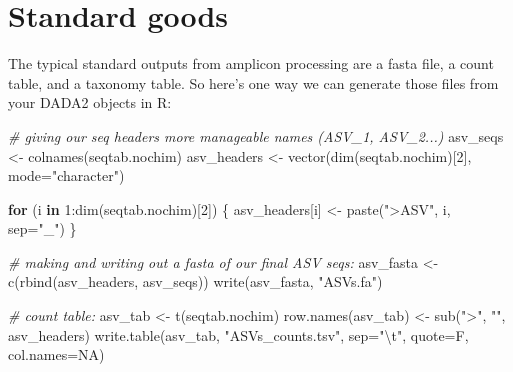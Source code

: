 \documentclass[
]{book}
\newenvironment{Shaded}{\begin{snugshade}}{\end{snugshade}}
\newcommand{\AttributeTok}[1]{\textcolor[rgb]{0.77,0.63,0.00}{#1}}
\newcommand{\CommentTok}[1]{\textcolor[rgb]{0.56,0.35,0.01}{\textit{#1}}}
\newcommand{\ConstantTok}[1]{\textcolor[rgb]{0.00,0.00,0.00}{#1}}
\newcommand{\ControlFlowTok}[1]{\textcolor[rgb]{0.13,0.29,0.53}{\textbf{#1}}}
\newcommand{\DecValTok}[1]{\textcolor[rgb]{0.00,0.00,0.81}{#1}}
\newcommand{\FunctionTok}[1]{\textcolor[rgb]{0.00,0.00,0.00}{#1}}
\newcommand{\NormalTok}[1]{#1}
\newcommand{\OtherTok}[1]{\textcolor[rgb]{0.56,0.35,0.01}{#1}}
\newcommand{\SpecialCharTok}[1]{\textcolor[rgb]{0.00,0.00,0.00}{#1}}
\newcommand{\StringTok}[1]{\textcolor[rgb]{0.31,0.60,0.02}{#1}}
\begin{document}
\hypertarget{standard-goods}{%
\section{Standard goods}\label{standard-goods}}

The typical standard outputs from amplicon processing are a fasta file, a count table, and a taxonomy table. So here's one way we can generate those files from your DADA2 objects in R:

\begin{Shaded}
\begin{Highlighting}[]
  \CommentTok{\# giving our seq headers more manageable names (ASV\_1, ASV\_2...)}
\NormalTok{asv\_seqs }\OtherTok{\textless{}{-}} \FunctionTok{colnames}\NormalTok{(seqtab.nochim)}
\NormalTok{asv\_headers }\OtherTok{\textless{}{-}} \FunctionTok{vector}\NormalTok{(}\FunctionTok{dim}\NormalTok{(seqtab.nochim)[}\DecValTok{2}\NormalTok{], }\AttributeTok{mode=}\StringTok{"character"}\NormalTok{)}

\ControlFlowTok{for}\NormalTok{ (i }\ControlFlowTok{in} \DecValTok{1}\SpecialCharTok{:}\FunctionTok{dim}\NormalTok{(seqtab.nochim)[}\DecValTok{2}\NormalTok{]) \{}
\NormalTok{  asv\_headers[i] }\OtherTok{\textless{}{-}} \FunctionTok{paste}\NormalTok{(}\StringTok{"\textgreater{}ASV"}\NormalTok{, i, }\AttributeTok{sep=}\StringTok{"\_"}\NormalTok{)}
\NormalTok{\}}

  \CommentTok{\# making and writing out a fasta of our final ASV seqs:}
\NormalTok{asv\_fasta }\OtherTok{\textless{}{-}} \FunctionTok{c}\NormalTok{(}\FunctionTok{rbind}\NormalTok{(asv\_headers, asv\_seqs))}
\FunctionTok{write}\NormalTok{(asv\_fasta, }\StringTok{"ASVs.fa"}\NormalTok{)}

  \CommentTok{\# count table:}
\NormalTok{asv\_tab }\OtherTok{\textless{}{-}} \FunctionTok{t}\NormalTok{(seqtab.nochim)}
\FunctionTok{row.names}\NormalTok{(asv\_tab) }\OtherTok{\textless{}{-}} \FunctionTok{sub}\NormalTok{(}\StringTok{"\textgreater{}"}\NormalTok{, }\StringTok{""}\NormalTok{, asv\_headers)}
\FunctionTok{write.table}\NormalTok{(asv\_tab, }\StringTok{"ASVs\_counts.tsv"}\NormalTok{, }\AttributeTok{sep=}\StringTok{"}\SpecialCharTok{\textbackslash{}t}\StringTok{"}\NormalTok{, }\AttributeTok{quote=}\NormalTok{F, }\AttributeTok{col.names=}\ConstantTok{NA}\NormalTok{)}


\end{Highlighting}
\end{Shaded}
\end{document}
